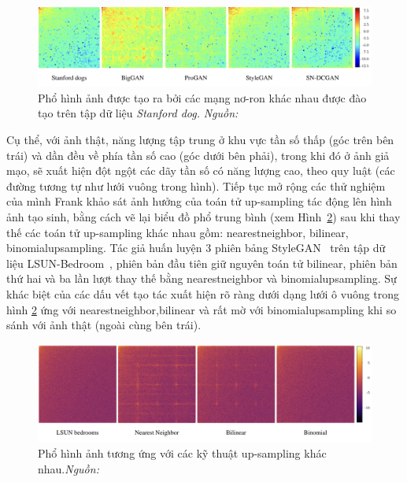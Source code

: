 %
\begin{figure}[h]
	\centering
	\includegraphics[width=1.0\linewidth]{Images/Stanford-dog-data-set-DCT-spectra.png}
	\begin{minipage}{0.9\linewidth}
		\caption{Phổ hình ảnh được tạo ra bởi các mạng nơ-ron khác nhau được đào tạo trên tập dữ liệu \textit{Stanford dog.} \textit{Nguồn: \cite{Frank2020LeveragingFA}}}
		\label{fig:dct-spectra-1}
	\end{minipage}
\end{figure}
%
Cụ thể, với ảnh thật, năng lượng tập trung ở khu vực tần số thấp (góc trên bên trái) và dần đều về phía tần số cao (góc dưới bên phải), trong khi đó ở ảnh giả mạo, sẽ xuất hiện đột ngột các dãy tần số có năng lượng cao, theo quy luật (các đường tương tự như lưới vuông trong hình). Tiếp tục mở rộng các thử nghiệm của mình Frank khảo sát ảnh hưởng của toán tử \gls{up-sampling} tác động lên hình ảnh tạo sinh, bằng cách vẽ lại biểu đồ phổ trung bình (xem Hình~\ref{fig:frank-spectrum-up-sampling-1}) sau khi thay thế các toán tử \gls{up-sampling} khác nhau gồm: \gls{nearestneighbor}, \gls{bilinear}, \gls{binomialupsampling}. Tác giả huấn luyện 3 phiên bảng StyleGAN~\cite{karras2019style} trên tập dữ liệu LSUN-Bedroom~\cite{Yu2015LSUNCO}, phiên bản đầu tiên giữ nguyên toán tử \gls{bilinear}, phiên bản thứ hai và ba lần lượt thay thế bằng \gls{nearestneighbor} và \gls{binomialupsampling}.
Sự khác biệt của các dấu vết tạo tác xuất hiện rõ ràng dưới dạng lưới ô vuông trong hình \ref{fig:frank-spectrum-up-sampling-1} ứng với \gls{nearestneighbor},\gls{bilinear} và rất mờ với \gls{binomialupsampling} khi so sánh với ảnh thật (ngoài cùng bên trái).
%
\begin{figure}[h]
	\centering
	\includegraphics[width=1.0\linewidth]{Images/frank-spectrum-up-sampling-1.png}
	\begin{minipage}{0.9\linewidth}
		\caption{Phổ hình ảnh tương ứng với các kỹ thuật \gls{up-sampling} khác nhau.\textit{Nguồn: \cite{Frank2020LeveragingFA}}}
		\label{fig:frank-spectrum-up-sampling-1}
	\end{minipage}
\end{figure}
%

